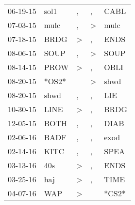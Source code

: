 \begin{supertabular}{p{0.07\textwidth}p{0.06\textwidth}p{0.02\textwidth}p{0.02\textwidth}p{0.06\textwidth}}
          06-19-15\textsuperscript{} &           sol1\textsuperscript{} &                , &                , &           CABL\textsuperscript{} \\
          07-03-15\textsuperscript{} &           mulc\textsuperscript{} &                , &     \textgreater &           mulc\textsuperscript{} \\
          07-18-15\textsuperscript{} &           BRDG\textsuperscript{} &     \textgreater &                , &           ENDS\textsuperscript{} \\
          08-06-15\textsuperscript{} &           SOUP\textsuperscript{} &                , &     \textgreater &           SOUP\textsuperscript{} \\
          08-14-15\textsuperscript{} &           PROW\textsuperscript{} &     \textgreater &                , &           OBLI\textsuperscript{} \\
          08-20-15\textsuperscript{} &                            *OS2* &                  &     \textgreater &           shwd\textsuperscript{} \\
          08-20-15\textsuperscript{} &           shwd\textsuperscript{} &                , &                , &            LIE\textsuperscript{} \\
          10-30-15\textsuperscript{} &           LINE\textsuperscript{} &     \textgreater &                , &           BRDG\textsuperscript{} \\
          12-05-15\textsuperscript{} &           BOTH\textsuperscript{} &                , &                , &           DIAB\textsuperscript{} \\
          02-06-16\textsuperscript{} &           BADF\textsuperscript{} &                , &                , &           exod\textsuperscript{} \\
          02-14-16\textsuperscript{} &           KITC\textsuperscript{} &                , &                , &           SPEA\textsuperscript{} \\
          03-13-16\textsuperscript{} &            40s\textsuperscript{} &     \textgreater &                , &           ENDS\textsuperscript{} \\
          03-25-16\textsuperscript{} &            haj\textsuperscript{} &     \textgreater &                , &           TIME\textsuperscript{} \\
          04-07-16\textsuperscript{} &            WAP\textsuperscript{} &     \textgreater &                  &                            *CS2* \\

\end{supertabular}
